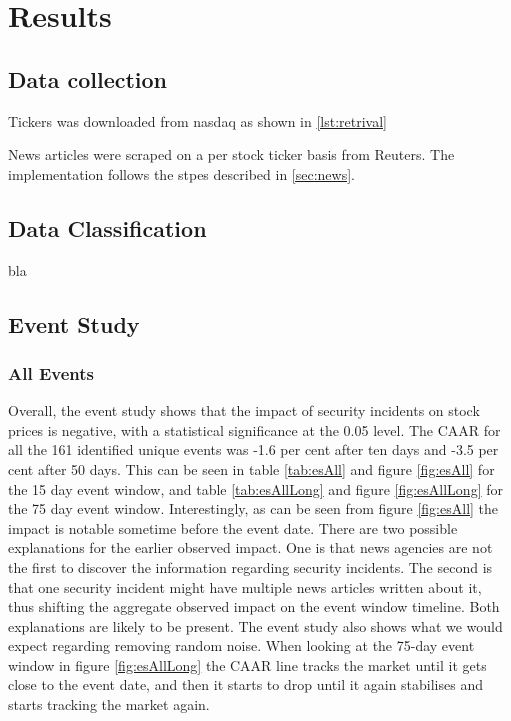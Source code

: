 \chapter{Results}
\label{chap:result}

\section{Data collection}
Tickers was downloaded from nasdaq as shown in \ref{lst:retrival}



News articles were scraped on a per stock ticker basis from Reuters. The implementation follows the stpes described in \ref{sec:news}. 

\section{Data Classification}
bla

\section{Event Study}
\subsection{All Events}
Overall, the event study shows that the impact of security incidents on stock prices is negative, with a statistical significance at the 0.05 level. The CAAR for all the 161 identified unique events was -1.6 per cent after ten days and -3.5 per cent after 50 days. This can be seen in table \ref{tab:esAll} and figure \ref{fig:esAll} for the 15 day event window, and table \ref{tab:esAllLong} and figure \ref{fig:esAllLong} for the 75 day event window. Interestingly, as can be seen from figure \ref{fig:esAll} the impact is notable sometime before the event date. There are two possible explanations for the earlier observed impact. One is that news agencies are not the first to discover the information regarding security incidents. The second is that one security incident might have multiple news articles written about it, thus shifting the aggregate observed impact on the event window timeline. Both explanations are likely to be present. The event study also shows what we would expect regarding removing random noise. When looking at the 75-day event window in figure \ref{fig:esAllLong} the CAAR line tracks the market until it gets close to the event date, and then it starts to drop until it again stabilises and starts tracking the market again.


